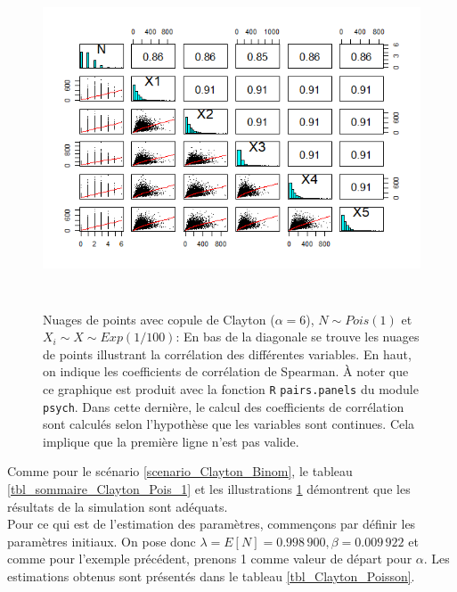 \documentclass{article}
\begin{document}
		\begin{figure}[H]
			\centering
			\includegraphics[height=10cm]{Graph/scatterplot_Poisson_1.png}
			\caption[Nuages de points du scénario \ref{scenario_Clayton_Pois}]{Nuages de points avec copule de Clayton ($\alpha = 6$), $N\sim Pois(1)$ et $X_i \sim X\sim Exp(1/100)$:
			En bas de la diagonale se trouve les nuages de points illustrant la corrélation des différentes variables. En haut, on indique les coefficients de corrélation de Spearman. À noter que ce graphique est produit avec la fonction \texttt{R} \texttt{pairs.panels} du module \texttt{psych}. Dans cette dernière, le calcul des coefficients de corrélation sont calculés selon l'hypothèse que les variables sont  continues. Cela implique que la première ligne n'est pas valide.} 
			\label{graph_scatterplot_Poiss_1}
		\end{figure}
	
		Comme pour le scénario \ref{scenario_Clayton_Binom}, le tableau \ref{tbl_sommaire_Clayton_Pois_1} et les illustrations \ref{graph_scatterplot_Poiss_1} démontrent que les résultats de la simulation sont adéquats.\\
		
		Pour ce qui est de l'estimation des paramètres, commençons par définir les paramètres initiaux. On pose donc $\lambda = E[N] = 0.998\,900, \beta = 0.009\,922$ et comme pour l'exemple précédent, prenons 1 comme valeur de départ pour $\alpha$. Les estimations obtenus sont présentés dans le tableau \ref{tbl_Clayton_Poisson}.
		
\end{document}
